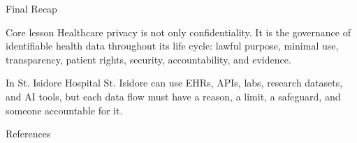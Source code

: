 \documentclass[presentation]{beamer}
\newcommand{\scenario}{St. Isidore Hospital}
\begin{document}
\begin{frame}[c]{Final Recap}
\begin{block}{Core lesson}
Healthcare privacy is not only confidentiality. It is the governance of identifiable health data
throughout its life cycle: lawful purpose, minimal use, transparency, patient rights, security,
accountability, and evidence.
\end{block}

\begin{exampleblock}{In \scenario}
St. Isidore can use EHRs, APIs, labs, research datasets, and AI tools, but each data flow must have
a reason, a limit, a safeguard, and someone accountable for it.
\end{exampleblock}
\end{frame}

\begin{frame}[allowframebreaks]{References}


\end{frame}
\end{document}
